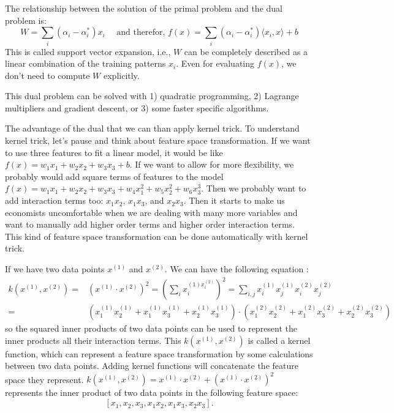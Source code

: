 \documentclass[a4paper]{article}
\begin{document}
The relationship between the solution of the primal problem and the dual problem is:
\begin{equation}
  W = \sum_i (\alpha_i - \alpha_i^*) x_i \quad \text{ and therefor, } f(x) = \sum_i(\alpha_i - \alpha_i^*) \langle x_i, x \rangle + b
\end{equation}
This is called support vector expansion, i.e., $W$ can be completely described as a linear combination of the training patterns $x_i$. Even for evaluating $f(x)$, we don't need to compute $W$ explicitly. 

This dual problem can be solved with 1) quadratic programming, 2) Lagrange multipliers and gradient descent, or 3) some faster specific algorithms.

The advantage of the dual that we can than apply kernel trick. To understand kernel trick, let's pause and think about feature space transformation. If we want to use three features to fit a linear model, it would be like $f(x) = w_1x_1 + w_2x_2 + w_3x_3 + b$. If we want to allow for more flexibility, we probably would add square terms of features to the model $f(x) = w_1x_1 + w_2x_2 + w_3x_3 + w_4 x_1^2 + w_5 x_2^2 + w_6 x_3^3$. Then we probably want to add interaction terms too: $x_1x_2$, $x_1x_3$, and $x_2x_3$. Then it starts to make us economists uncomfortable when we are dealing with many more variables and want to manually add higher order terms and higher order interaction terms. This kind of feature space transformation can be done automatically with kernel trick.

If we have two data points $x^{(1)}$ and $x^{(2)}$. We can have the following equation \citep{konstantin}:
\begin{align}
k(x^{(1)}, x^{(2)}) = & (x^{(1)} \cdot x^{(2)})^2 = (\sum_i x_i^{(1) x_i^{(2)}})^2 = \sum_{i,j} x^{(1)}_i x^{(1)}_j x^{(2)}_i x^{(2)}_j \\
= & (x^{(1)}_1 x^{(1)}_2 + x^{(1)}_1 x^{(1)}_3 + x^{(1)}_2 x^{(1)}_3 ) \cdot (x^{(2)}_1 x^{(2)}_2 + x^{(2)}_1 x^{(2)}_3 + x^{(2)}_2 x^{(2)}_3 )
\end{align}
so the squared inner products of two data points can be used to represent the inner products all their interaction terms. This $k(x^{(1)}, x^{(2)})$ is called a kernel function, which can represent a feature space transformation by some calculations between two data points. Adding kernel functions will concatenate the feature space they represent. $k(x^{(1)}, x^{(2)}) = x^{(1)} \cdot x^{(2)} + (x^{(1)} \cdot x^{(2)})^2 $ represents the inner product of two data points in the following feature space:
\begin{equation}
  \left[x_1, x_2, x_3, x_1x_2, x_1x_3, x_2x_3\right].
\end{equation}
\end{document}
